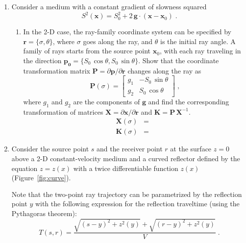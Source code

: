 \begin{enumerate}
\item Consider a medium with a constant gradient of slowness squared
  \begin{equation}
    S^2(\mathbf{x}) = S_0^2 + 2\,\mathbf{g} \cdot (\mathbf{x}-\mathbf{x}_0)\;.
  \end{equation}
\begin{enumerate}
\item In the 2-D case, the ray-family coordinate system can be
  specified by $\mathbf{r}=\{\sigma,\theta\}$, where $\sigma$ goes
  along the ray, and $\theta$ is the initial ray angle. A family of
  rays starts from the source point $\mathbf{x}_0$, with each ray
  traveling in the direction $\mathbf{p_0} =
  \{S_0\,\cos{\theta},S_0\,\sin{\theta}\}$. Show that the coordinate
  transformation matrix $\mathbf{P}=\partial \mathbf{p}/\partial
  \mathbf{r}$ changes along the ray as
  \begin{equation}
    \label{eq:p}
    \mathbf{P}(\sigma) = \left[\begin{array}{cc} 
        g_1 & -S_0\,\sin{\theta} \\
        g_2 & S_0\,\cos{\theta} \end{array}\right]\;,
  \end{equation}
  where $g_1$ and $g_2$ are the components of $\mathbf{g}$ and find
  the corresponding transformation of matrices
  $\mathbf{X}=\partial \mathbf{x}/\partial \mathbf{r}$ and
  $\mathbf{K}=\mathbf{P}\,\mathbf{X}^{-1}$.
  \begin{eqnarray}
    \label{eq:x}
    \mathbf{X}(\sigma)  & = & \\ 
    \mathbf{K}(\sigma)  & = & 
    \label{eq:k}
    \end{eqnarray}

  \end{enumerate}

\item Consider the source point $s$ and the receiver point $r$ at the
  surface $z=0$ above a 2-D constant-velocity medium and a curved
  reflector defined by the equation $z = z(x)$ with a twice
  differentiable function $z(x)$ (Figure~\ref{fig:curve}).


  Note that the two-point ray trajectory can be parametrized by the
  reflection point $y$ with the following expression for the
  reflection traveltime (using the Pythagoras theorem):
  \begin{equation}
      T(s,r) = {\frac{\sqrt{(s-y)^2+z^2(y)}+\sqrt{(r-y)^2+z^2(y)}}{V}}\;.
      \label{eq:dsr}
  \end{equation}


\end{enumerate}
